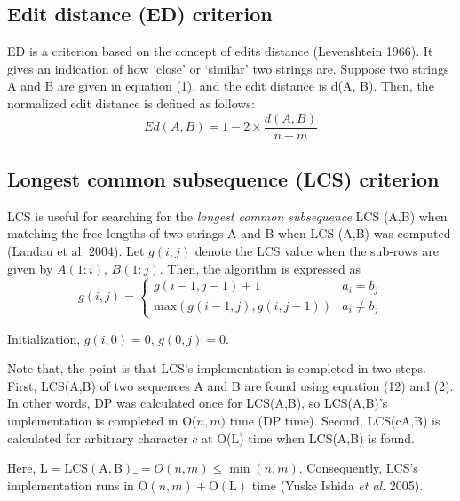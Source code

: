 \documentclass[english]{jnlp_1.4}
\begin{document}
\subsection{Edit distance (ED) criterion}

ED is a criterion based on the concept of edits distance (Levenshtein 1966). 
It gives an indication of how `close' or `similar' two strings are. Suppose 
two strings A and B are given in equation (1), and the edit distance is d(A, 
B). Then, the normalized edit distance is defined as follows:
\begin{equation}
 Ed(A,B)=1-2 \times \frac{d(A,B)}{n+m}
\end{equation}


\subsection{Longest common subsequence (LCS) criterion}

LCS is useful for searching for the \textit{longest common subsequence} LCS (A,B) when matching the free 
lengths of two strings A and B when LCS (A,B) was computed (Landau et al. 
2004). Let $g(i,j)$ denote the LCS value when the sub-rows are given by 
$A(1:i)$, $B(1:j)$. Then, the algorithm is expressed as
\pagebreak
\begin{equation}
 g(i,j)=
 \begin{cases}
	g(i-1,j-1)+1 & a_{i}=b_{j} \\
	\mathrm{max}(g(i-1,j), g(i,j-1)) & a_{i} \neq b_{j}
 \end{cases}
\end{equation}

Initialization, $g(i,0)=0$, $g(0,j)=0$.

Note that, the point is that LCS's implementation is completed in two steps. 
First, LCS(A,B) of two sequences A and B are found using equation (12) and 
(2). In other words, DP was calculated once for LCS(A,B), so LCS(A,B)'s 
implementation is completed in O($n,m)$ time (DP time). Second, LCS(cA,B) is 
calculated for arbitrary character $c$ at O(L) time when LCS(A,B) is found.

Here, $\mathrm{L}=\mathrm{LCS(A,B)}{\_}=O(n,m) \le \min(n,m)$. Consequently, LCS's implementation 
runs in $\mathrm{O}(n,m)+\mathrm{O(L)}$ time (Yuske Ishida \textit{et al}. 2005).
\end{document}
